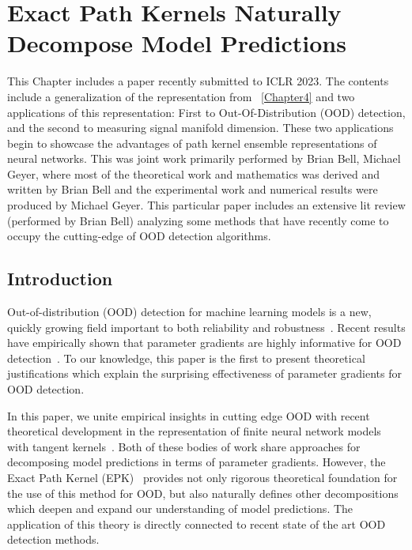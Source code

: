 \chapter{Exact Path Kernels Naturally Decompose Model Predictions}
\label{Chapter4a}

This Chapter includes a paper recently submitted to ICLR 2023. The
contents include a generalization of the representation from
~\ref{Chapter4} and two applications of this representation: First to
Out-Of-Distribution (OOD) detection, and the second to measuring
signal manifold dimension. These two applications begin to showcase
the advantages of path kernel ensemble representations of neural
networks. This was joint work primarily performed by Brian Bell,
Michael Geyer, where most of the theoretical work and mathematics was
derived and written by Brian Bell and the experimental work and
numerical results were produced by Michael Geyer. This particular
paper includes an extensive lit review (performed by Brian Bell)
analyzing some methods that have recently come to occupy the
cutting-edge of OOD detection algorithms. 




\section{Introduction}

Out-of-distribution (OOD) detection for machine learning models is a new, quickly growing field important to both reliability and robustness~\citep{hendrycks2019, biggio2014, hendrycks2017, desilva2023, yang2021, filos2020autonomous}.
Recent results have empirically shown that parameter gradients are highly informative for OOD detection~\citep{behpour2023, djurisic2023extremely, huang2021}.
To our knowledge, this paper is the first to present theoretical justifications which explain the surprising effectiveness of parameter gradients for OOD detection.

In this paper, we unite empirical insights in cutting edge OOD with recent theoretical development in the representation of finite neural network models with tangent kernels~\citep{bell2023,chen2021equivalence,domingos2020}. 
Both of these bodies of work share approaches for decomposing model predictions in terms of parameter gradients. 
However, the Exact Path Kernel (EPK)~\citep{bell2023} provides not only rigorous theoretical foundation for the use of this method for OOD, but also naturally defines other decompositions which deepen and expand our understanding of model predictions. The application of this theory is directly connected to recent state of the art OOD detection methods.


